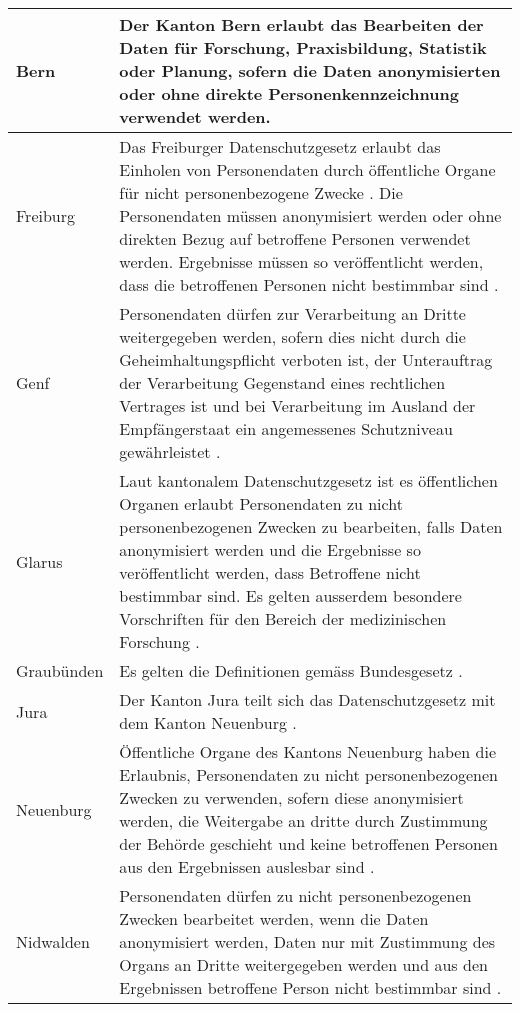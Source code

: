 \begin{longtable}{| p{} | p{}|}
		\hline
    Bern & Der Kanton Bern \parencite[§§ 15 Abs. 1]{DSSGBERN} erlaubt das Bearbeiten der Daten für Forschung, Praxisbildung, Statistik oder Planung, sofern die Daten anonymisierten oder ohne direkte Personenkennzeichnung verwendet werden. \\
		\hline
		Freiburg & Das Freiburger Datenschutzgesetz erlaubt das Einholen von Personendaten durch öffentliche Organe für nicht personenbezogene Zwecke \parencite[§§ 14 Abs. 1]{DSSGFR}. Die Personendaten müssen anonymisiert werden oder ohne direkten Bezug auf betroffene Personen verwendet werden. Ergebnisse müssen so veröffentlicht werden, dass die betroffenen Personen nicht bestimmbar sind \parencite[§ 16 Abs. 1-2]{DSSGFR}.  \\
		\hline
    Genf & Personendaten dürfen zur Verarbeitung an Dritte weitergegeben werden, sofern dies nicht durch die Geheimhaltungspflicht verboten ist, der Unterauftrag der Verarbeitung Gegenstand eines rechtlichen Vertrages ist und bei Verarbeitung im Ausland der Empfängerstaat ein angemessenes Schutzniveau gewährleistet \parencite[§§ 13A Abs. 1-5]{DSSGGE}. \\
		\hline
		Glarus & Laut kantonalem Datenschutzgesetz ist es öffentlichen Organen erlaubt Personendaten zu nicht personenbezogenen Zwecken zu bearbeiten, falls Daten anonymisiert werden und die Ergebnisse so veröffentlicht werden, dass Betroffene nicht bestimmbar sind. Es gelten ausserdem besondere Vorschriften für den Bereich der medizinischen Forschung \parencite[§§ 11 Abs 1-2]{DSSGGL}. \\
		\hline
		Graubünden & Es gelten die Definitionen gemäss Bundesgesetz \parencite[§§ 2 Abs. 2-3]{DSSGGR}.  \\
		\hline
		Jura & Der Kanton Jura teilt sich das Datenschutzgesetz mit dem Kanton Neuenburg \parencite[S. 1 Abs. 2]{JURAAbkommenNE}. \\
		\hline
		Neuenburg & Öffentliche Organe des Kantons Neuenburg haben die Erlaubnis, Personendaten zu nicht personenbezogenen Zwecken zu verwenden, sofern diese anonymisiert werden, die Weitergabe an dritte durch Zustimmung der Behörde geschieht und keine betroffenen Personen aus den Ergebnissen auslesbar sind \parencite[§§ 25 Abs. 1]{DSSGNE}. \\
		\hline
		Nidwalden & Personendaten dürfen zu nicht personenbezogenen Zwecken bearbeitet werden, wenn die Daten anonymisiert werden, Daten nur mit Zustimmung des Organs an Dritte weitergegeben werden und aus den Ergebnissen betroffene Person nicht bestimmbar sind \parencite[§§ 16 Abs 1-2]{DSSGNW}. \\

\end{longtable}

